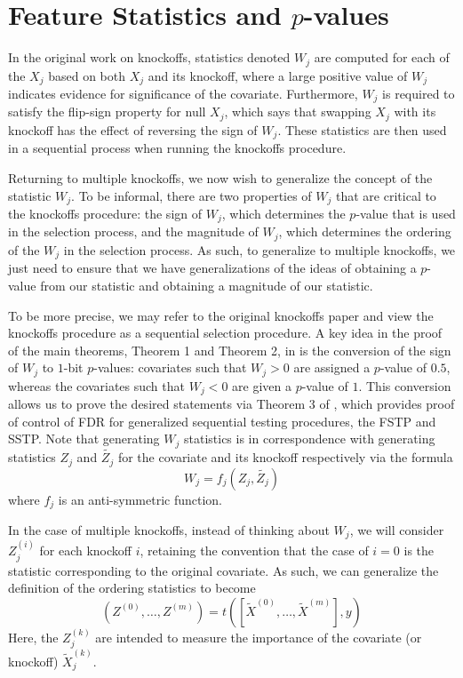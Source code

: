 \section{Feature Statistics and \texorpdfstring{$p$}{p}-values}
In the original work on knockoffs, statistics denoted $W_j$ are computed for each of the $X_j$ based on both $X_j$ and its knockoff, where a large positive value of $W_j$ indicates evidence for significance of the covariate. Furthermore, $W_j$ is required to satisfy the flip-sign property for null $X_j$, which says that swapping $X_j$ with its knockoff has the effect of reversing the sign of $W_j$. These statistics are then used in a sequential process when running the knockoffs procedure.

Returning to multiple knockoffs, we now wish to generalize the concept of the statistic $W_j$. To be informal, there are two properties of $W_j$ that are critical to the knockoffs procedure: the sign of $W_j$, which determines the $p$-value that is used in the selection process, and the magnitude of $W_j$, which determines the ordering of the $W_j$ in the selection process. As such, to generalize to multiple knockoffs, we just need to ensure that we have generalizations of the ideas of obtaining a $p$-value from our statistic and obtaining a magnitude of our statistic. 

To be more precise, we may refer to the original knockoffs paper \cite{knockoffs} and view the knockoffs procedure as a sequential selection procedure. A key idea in the proof of the main theorems, Theorem 1 and Theorem 2, in \cite{knockoffs} is the conversion of the sign of $W_j$ to $1$-bit $p$-values: covariates such that $W_j > 0$ are assigned a $p$-value of $0.5$, whereas the covariates such that $W_j < 0$ are given a $p$-value of $1$. This conversion allows us to prove the desired statements via Theorem 3 of \cite{knockoffs}, which provides proof of control of FDR for generalized sequential testing procedures, the FSTP and SSTP. Note that generating $W_j$ statistics is in correspondence with generating statistics $Z_j$ and $\tilde{Z_j}$ for the covariate and its knockoff respectively via the formula
\begin{equation}
W_j = f_j(Z_j, \tilde{Z_j})
\end{equation}
where $f_j$ is an anti-symmetric function. 

In the case of multiple knockoffs, instead of thinking about $W_j$, we will consider $Z_j^{(i)}$ for each knockoff $i$, retaining the convention that the case of $i = 0$ is the statistic corresponding to the original covariate. As such, we can generalize the definition of the ordering statistics to become
\begin{equation}
(Z^{(0)},\ldots, Z^{(m)}) = t([\tilde{X}^{(0)}, \ldots, \tilde{X}^{(m)}], y)
\end{equation}
Here, the $Z^{(k)}_j$ are intended to measure the importance of the covariate (or knockoff) $\tilde{X}^{(k)}_j$. 

